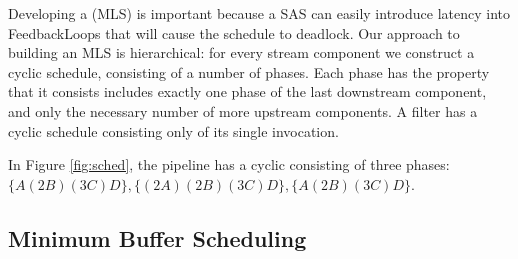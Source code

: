 Developing a (MLS) is important because a SAS can easily introduce latency 
into FeedbackLoops that will cause the schedule to deadlock.  Our approach 
to building an MLS is hierarchical: for every stream component we construct
a cyclic schedule, consisting of a number of phases.  Each phase has the
property that it consists includes exactly one phase of the last downstream
component, and only the necessary number of more upstream components.
A filter has a cyclic schedule consisting only of its single invocation.

In Figure \ref{fig:sched}, the pipeline has a cyclic consisting of three
phases: $\{A(2B)(3C)D\}, \{(2A)(2B)(3C)D\}, \{A(2B)(3C)D\}$.

\subsection{Minimum Buffer Scheduling}




